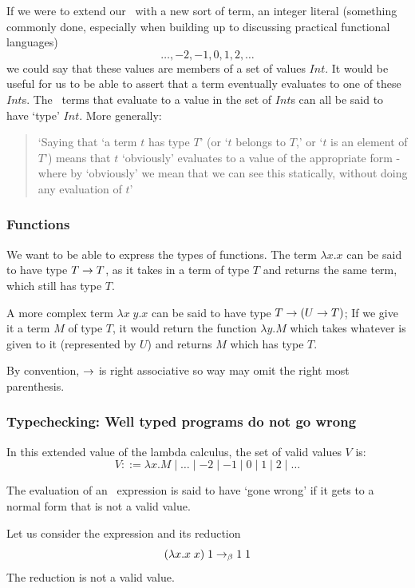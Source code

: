 If we were to extend our \lcalc\ with a new sort of term, an integer literal (something commonly done, especially when building up to discussing practical functional languages) \[\dots, -2, -1, 0, 1, 2, \dots\] we could say that these values are members of a set of values $Int$. It would be useful for us to be able to assert that a term eventually evaluates to one of these $Int$s. The \lcalc\ terms that evaluate to a value in the set of $Int$s can all be said to have `type' $Int$. More generally: 

\begin{quote}
`Saying that `a term $t$ has type $T$' (or `$t$ belongs to $T$,' or `$t$ is an element of $T$') means that $t$ `obviously' evaluates to a value of the appropriate form - where by `obviously' we mean that we can see this statically, without doing any evaluation of $t$' \cite{pierce2002types}
\end{quote}

\subsubsection{Functions}
We want to be able to express the types of functions. The term \(\lambda x. x\) can be said to have type \(T \rightarrow T\), as it takes in a term of type $T$ and returns the same term, which still has type $T$.

A more complex term \(\lambda x\;y.x\) can be said to have type \(T \rightarrow (U \rightarrow T)\); If we give it a term $M$ of type $T$, it would return the function \(\lambda y.M\) which takes whatever is given to it (represented by $U$) and returns $M$ which has type $T$. 

By convention, $\rightarrow$ is right associative so way may omit the right most parenthesis. 

\subsubsection{Typechecking: Well typed programs do not go wrong}
In this extended value of the lambda calculus, the set of valid values $V$ is:
\[
V ::= \lambda x. M \mid \dots \mid -2\mid -1\mid 0\mid 1\mid 2\mid \dots 
\]

The evaluation of an \lcalc\ expression is said to have `gone wrong' if it gets to a normal form that is not a valid value.

Let us consider the expression and its reduction
\[
(\lambda x. x\;x) \;1 \rightarrow_\beta 1\;1
\]
\noindent The reduction is not a valid value.

